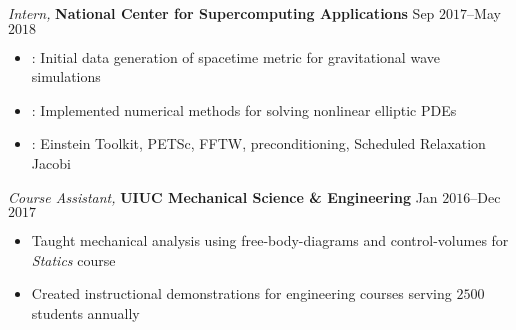 \documentclass[10pt]{article}
\begin{document}
\begin{multicols}{2}
\vspace{0.5em}
%
\textit{Intern,} \textbf{National Center for Supercomputing Applications} \hfill Sep $2017$--May $2018$

\vspace{-1.75em}
\begin{itemize}[label=-]
    \setlength\itemsep{-0.25em}
    \setlength{\itemindent}{-1.50em}
    \item {}: Initial data generation of spacetime metric for gravitational wave simulations
    \item {}: Implemented numerical methods for solving nonlinear elliptic PDEs
    \item {}: {Einstein Toolkit}, {PETSc}, {FFTW}, preconditioning, {Scheduled Relaxation Jacobi}
\end{itemize}
\vspace{-2.0em}

\vspace{0.5em}
%
{\sl Course Assistant,} \textbf{UIUC Mechanical Science \& Engineering} \hfill Jan $2016$--Dec $2017$

\vspace{-1.75em}
\begin{itemize}[label=-]
    \setlength\itemsep{-0.25em}
    \setlength{\itemindent}{-1.50em}
    \item Taught mechanical analysis using free-body-diagrams and control-volumes for \textit{Statics} course
    \item Created instructional demonstrations for engineering courses serving $2500$ students annually
\end{itemize}
\vspace{-2.0em}

\end{multicols}
\vspace{-1.5em}
\end{document}

